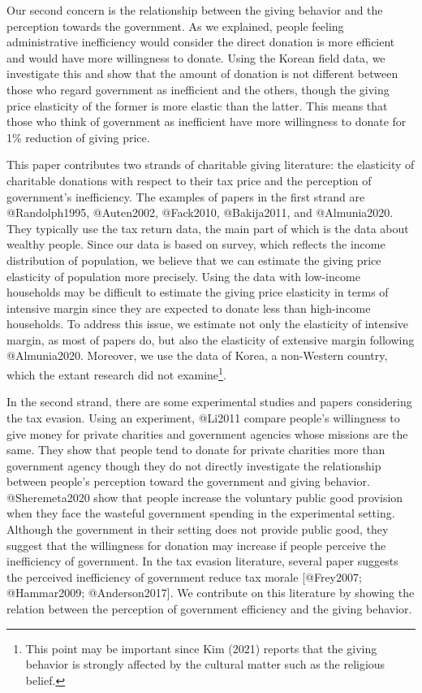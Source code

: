 \documentclass[
]{article}
\begin{document}
Our second concern is the relationship between the giving behavior and the perception towards the government. As we explained, people feeling administrative inefficiency would consider the direct donation is more efficient and would have more willingness to donate. Using the Korean field data, we investigate this and show that the amount of donation is not different between those who regard government as inefficient and the others, though the giving price elasticity of the former is more elastic than the latter. This means that those who think of government as inefficient have more willingness to donate for 1\% reduction of giving price.

This paper contributes two strands of charitable giving literature: the elasticity of charitable donations with respect to their tax price and the perception of government's inefficiency. The examples of papers in the first strand are @Randolph1995, @Auten2002, @Fack2010, @Bakija2011, and @Almunia2020. They typically use the tax return data, the main part of which is the data about wealthy people. Since our data is based on survey, which reflects the income distribution of population, we believe that we can estimate the giving price elasticity of population more precisely. Using the data with low-income households may be difficult to estimate the giving price elasticity in terms of intensive margin since they are expected to donate less than high-income households. To address this issue, we estimate not only the elasticity of intensive margin, as most of papers do, but also the elasticity of extensive margin following @Almunia2020.
Moreover, we use the data of Korea, a non-Western country, which the extant research did not examine\footnote{This point may be important since Kim (2021) reports that the giving behavior is strongly affected by the cultural matter such as the religious belief.}.

In the second strand, there are some experimental studies and papers considering the tax evasion. Using an experiment, @Li2011 compare people's willingness to give money for private charities and government agencies whose missions are the same. They show that people tend to donate for private charities more than government agency though they do not directly investigate the relationship between people's perception toward the government and giving behavior. @Sheremeta2020 show that people increase the voluntary public good provision when they face the wasteful government spending in the experimental setting. Although the government in their setting does not provide public good, they suggest that the willingness for donation may increase if people perceive the inefficiency of government. In the tax evasion literature, several paper suggests the perceived inefficiency of government reduce tax morale {[}@Frey2007; @Hammar2009; @Anderson2017{]}. We contribute on this literature by showing the relation between the perception of government efficiency and the giving behavior.
\end{document}
